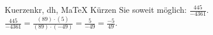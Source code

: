 \begin{MAufgabe}{Kuerzen}{kr, dh, MaTeX}
K\"urzen Sie soweit m\"oglich: $\frac{445}{-4361}$.\\ 
\ifLsg\MLoesung
\quad $\frac{445}{-4361}=\frac{(89)\cdot(5)}{(89)\cdot(-49)}=\frac{5}{-49}=\frac{-5}{49}$.\else\relax\fi
 \end{MAufgabe}